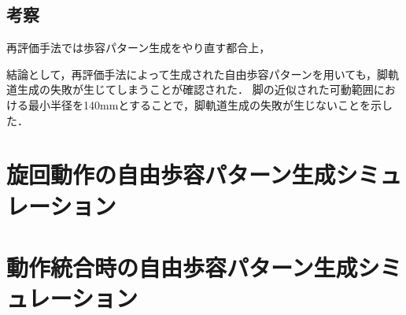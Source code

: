 \subsection{考察}
再評価手法では歩容パターン生成をやり直す都合上，

結論として，再評価手法によって生成された自由歩容パターンを用いても，脚軌道生成の失敗が生じてしまうことが確認された．
脚の近似された可動範囲における最小半径を140mmとすることで，脚軌道生成の失敗が生じないことを示した．

\section{旋回動作の自由歩容パターン生成シミュレーション}

\section{動作統合時の自由歩容パターン生成シミュレーション}
